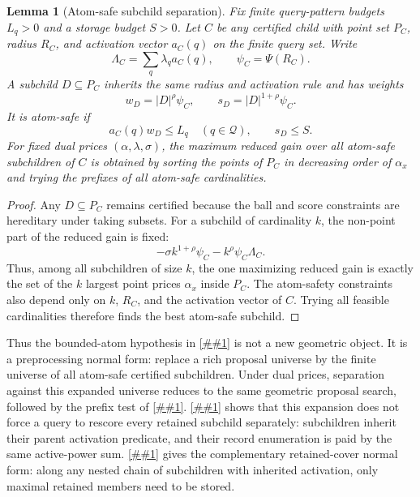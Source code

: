 \documentclass[10pt]{article}
\newcommand{\cref}[1]{\ref{##1}}
\newcommand{\Cref}[1]{\ref{##1}}
\newtheorem{lemma}[theorem]{Lemma}
\theoremstyle{definition}
\begin{document}
\begin{lemma}[Atom-safe subchild separation]\label{lem:atom-safe-subchild}
   Fix finite query-pattern budgets $L_q>0$ and a storage budget $S>0$.  Let
   $C$ be any certified child with point set $P_C$, radius $R_C$, and activation
   vector $a_C(q)$ on the finite query set.  Write
   \[
      \Lambda_C=\sum_q\lambda_q a_C(q),
      \qquad
      \psi_C=\Psi(R_C).
   \]
   A subchild $D\subseteq P_C$ inherits the same radius and activation rule and
   has weights
   \[
      w_D=|D|^\rho\psi_C,
      \qquad
      s_D=|D|^{1+\rho}\psi_C .
   \]
   It is atom-safe if
   \[
      a_C(q)w_D\le L_q\quad(q\in\mathcal Q),
      \qquad
      s_D\le S .
   \]
   For fixed dual prices $(\alpha,\lambda,\sigma)$, the maximum reduced gain
   over all atom-safe subchildren of $C$ is obtained by sorting the points of
   $P_C$ in decreasing order of $\alpha_x$ and trying the prefixes of all
   atom-safe cardinalities.
\end{lemma}

\begin{proof}
   Any $D\subseteq P_C$ remains certified because the ball and score
   constraints are hereditary under taking subsets.  For a subchild of
   cardinality $k$, the non-point part of the reduced gain is fixed:
   \[
      -\sigma k^{1+\rho}\psi_C
      -
      k^\rho\psi_C\Lambda_C .
   \]
   Thus, among all subchildren of size $k$, the one maximizing reduced gain is
   exactly the set of the $k$ largest point prices $\alpha_x$ inside $P_C$.
   The atom-safety constraints also depend only on $k$, $R_C$, and the activation
   vector of $C$.  Trying all feasible cardinalities therefore finds the best
   atom-safe subchild.
\end{proof}

Thus the bounded-atom hypothesis in
\cref{lem:fractional-cover-materialization} is not a new geometric object.  It
is a preprocessing normal form: replace a rich proposal universe by the finite
universe of all atom-safe certified subchildren.  Under dual prices, separation
against this expanded universe reduces to the same geometric proposal search,
followed by the prefix test of \cref{lem:atom-safe-subchild}.
\Cref{lem:shared-predicate-decoder} shows that this expansion does not force a
query to rescore every retained subchild separately: subchildren inherit their
parent activation predicate, and their record enumeration is paid by the same
active-power sum.
\Cref{lem:dominated-child-pruning} gives the complementary retained-cover
normal form: along any nested chain of subchildren with inherited activation,
only maximal retained members need to be stored.
\end{document}
